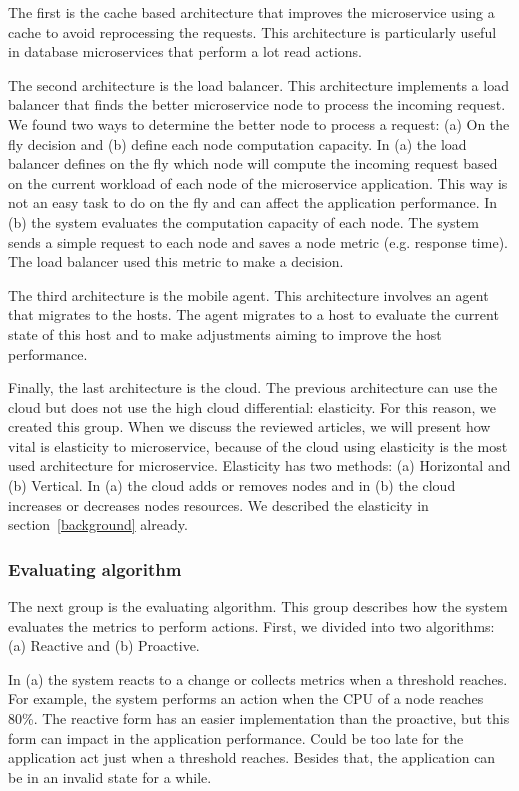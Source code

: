 The first is the cache based architecture that improves the microservice using a cache to avoid reprocessing the requests. This architecture is particularly useful in database microservices that perform a lot read actions. 

The second architecture is the load balancer. This architecture implements a load balancer that finds the better microservice node to process the incoming request. We found two ways to determine the better node to process a request: (a) On the fly decision and (b) define each node computation capacity. In (a) the load balancer defines on the fly which node will compute the incoming request based on the current workload of each node of the microservice application. This way is not an easy task to do on the fly and can affect the application performance. In (b) the system evaluates the computation capacity of each node. The system sends a simple request to each node and saves a node metric (e.g. response time). The load balancer used this metric to make a decision.

The third architecture is the mobile agent. This architecture involves an agent that migrates to the hosts. The agent migrates to a host to evaluate the current state of this host and to make adjustments aiming to improve the host performance.

Finally, the last architecture is the cloud. The previous architecture can use the cloud but does not use the high cloud differential: elasticity. For this reason, we created this group. When we discuss the reviewed articles, we will present how vital is elasticity to microservice, because of the cloud using elasticity is the most used architecture for microservice. Elasticity has two methods: (a) Horizontal and (b) Vertical.  In (a) the cloud adds or removes nodes and in (b) the cloud increases or decreases nodes resources. We described the elasticity in section~\ref{background} already.

\subsubsection{Evaluating algorithm}
The next group is the evaluating algorithm. This group describes how the system evaluates the metrics to perform actions. First, we divided into two algorithms: (a) Reactive and (b) Proactive. 

In (a) the system reacts to a change or collects metrics when a threshold reaches. For example, the system performs an action when the CPU of a node reaches 80\%. The reactive form has an easier implementation than the proactive, but this form can impact in the application performance. Could be too late for the application act just when a threshold reaches. Besides that, the application can be in an invalid state for a while. 

